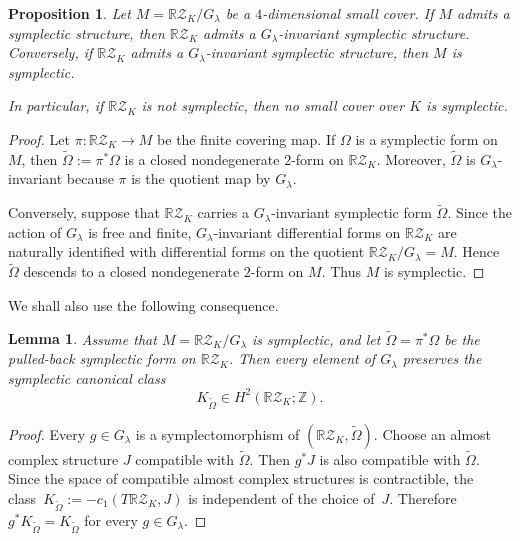 \documentclass{amsart}
\newtheorem{lemma}[theorem]{Lemma}
\newtheorem{proposition}[theorem]{Proposition}
\numberwithin{equation}{section}
\theoremstyle{definition}
\theoremstyle{remark}
\newcommand{\Z}{\mathbb Z}
\newcommand{\RZ}{\mathbb R\mathcal Z}
\begin{document}
\begin{proposition} \label{prop:canonical-cover-obstruction}
    Let $M = \RZ_K/G_\lambda$ be a $4$-dimensional small cover.
    If $M$ admits a symplectic structure, then $\RZ_K$ admits a $G_\lambda$-invariant symplectic structure.
    Conversely, if $\RZ_K$ admits a $G_\lambda$-invariant symplectic structure, then $M$ is symplectic.
    
    In particular, if $\RZ_K$ is not symplectic, then no small cover over $K$ is symplectic.
\end{proposition}
\begin{proof}
    Let $\pi \colon \RZ_K \to M$ be the finite covering map. 
    If $\Omega$ is a symplectic form on $M$, then $\widetilde\Omega:=\pi^\ast \Omega$ is a closed nondegenerate $2$-form on $\RZ_K$. 
    Moreover, $\widetilde\Omega$ is $G_\lambda$-invariant because $\pi$ is the quotient map by $G_\lambda$.
    
    Conversely, suppose that $\RZ_K$ carries a $G_\lambda$-invariant symplectic form $\widetilde\Omega$. 
    Since the action of $G_\lambda$ is free and finite, $G_\lambda$-invariant differential forms on $\RZ_K$ are naturally identified with differential forms on the quotient $\RZ_K/G_\lambda=M$. 
    Hence $\widetilde\Omega$ descends to a closed nondegenerate $2$-form on $M$. 
    Thus $M$ is symplectic.
\end{proof}

We shall also use the following consequence.

\begin{lemma} \label{lem:canonical-class-invariant}
    Assume that $M=\RZ_K/G_\lambda$ is symplectic, and let $\widetilde\Omega=\pi^\ast\Omega$ be the pulled-back symplectic form on $\RZ_K$. 
    Then every element of $G_\lambda$ preserves the symplectic canonical class
    $$
        K_{\widetilde\Omega}\in H^2(\RZ_K;\Z).
    $$
\end{lemma}
\begin{proof}
    Every $g\in G_\lambda$ is a symplectomorphism of $(\RZ_K,\widetilde\Omega)$. 
    Choose an almost complex structure $J$ compatible with $\widetilde\Omega$. 
    Then $g^\ast J$ is also compatible with $\widetilde\Omega$. 
    Since the space of compatible almost complex structures is contractible, the class~$K_{\widetilde\Omega}:=-c_1(T\RZ_K,J)$ is independent of the choice of~$J$. 
    Therefore $g^\ast K_{\widetilde\Omega}=K_{\widetilde\Omega}$ for every $g\in G_\lambda$.
\end{proof}
\end{document}
